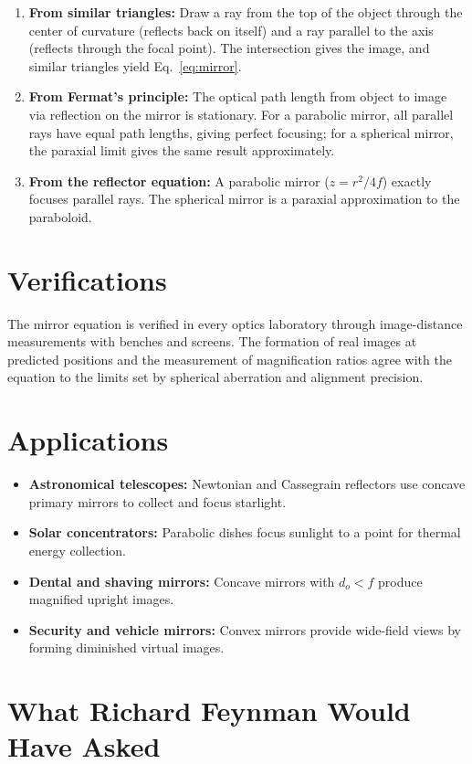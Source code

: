 \begin{enumerate}
  \item \textbf{From similar triangles:} Draw a ray from the top of the object through the center of curvature (reflects back on itself) and a ray parallel to the axis (reflects through the focal point). The intersection gives the image, and similar triangles yield Eq.~\eqref{eq:mirror}.
  \item \textbf{From Fermat's principle:} The optical path length from object to image via reflection on the mirror is stationary. For a parabolic mirror, all parallel rays have equal path lengths, giving perfect focusing; for a spherical mirror, the paraxial limit gives the same result approximately.
  \item \textbf{From the reflector equation:} A parabolic mirror ($z = r^{2}/4f$) exactly focuses parallel rays. The spherical mirror is a paraxial approximation to the paraboloid.
\end{enumerate}
\section*{Verifications}

The mirror equation is verified in every optics laboratory through image-distance measurements with benches and screens. The formation of real images at predicted positions and the measurement of magnification ratios agree with the equation to the limits set by spherical aberration and alignment precision.
\section*{Applications}

\begin{itemize}
  \item \textbf{Astronomical telescopes:} Newtonian and Cassegrain reflectors use concave primary mirrors to collect and focus starlight.
  \item \textbf{Solar concentrators:} Parabolic dishes focus sunlight to a point for thermal energy collection.
  \item \textbf{Dental and shaving mirrors:} Concave mirrors with $d_{o} < f$ produce magnified upright images.
  \item \textbf{Security and vehicle mirrors:} Convex mirrors provide wide-field views by forming diminished virtual images.
\end{itemize}
\section*{What Richard Feynman Would Have Asked}


